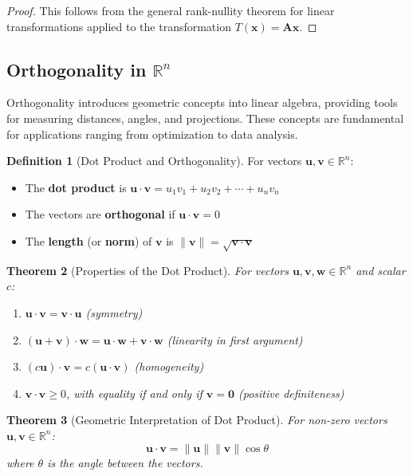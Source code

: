 \documentclass[12pt]{article}
\numberwithin{equation}{section}
\newcommand{\vect}[1]{\boldsymbol{#1}}   %
\newcommand{\mat}[1]{\mathbf{#1}}        %
\theoremstyle{plain}
\newtheorem{theorem}{Theorem}[section]
\theoremstyle{definition}
\newtheorem{definition}[theorem]{Definition}
\theoremstyle{remark}
\begin{document}
\begin{proof}
This follows from the general rank-nullity theorem for linear transformations applied to the transformation $T(\vect{x}) = \mat{A}\vect{x}$.
\end{proof}

\subsection{Orthogonality in $\mathbb{R}^n$}

Orthogonality introduces geometric concepts into linear algebra, providing tools for measuring distances, angles, and projections. These concepts are fundamental for applications ranging from optimization to data analysis.

\begin{definition}[Dot Product and Orthogonality]
For vectors $\vect{u}, \vect{v} \in \mathbb{R}^n$:
\begin{itemize}
\item The \textbf{dot product} is $\vect{u} \cdot \vect{v} = u_1v_1 + u_2v_2 + \cdots + u_nv_n$
\item The vectors are \textbf{orthogonal} if $\vect{u} \cdot \vect{v} = 0$
\item The \textbf{length} (or \textbf{norm}) of $\vect{v}$ is $\|\vect{v}\| = \sqrt{\vect{v} \cdot \vect{v}}$
\end{itemize}
\end{definition}

\begin{theorem}[Properties of the Dot Product]
For vectors $\vect{u}, \vect{v}, \vect{w} \in \mathbb{R}^n$ and scalar $c$:
\begin{enumerate}
\item $\vect{u} \cdot \vect{v} = \vect{v} \cdot \vect{u}$ (symmetry)
\item $(\vect{u} + \vect{v}) \cdot \vect{w} = \vect{u} \cdot \vect{w} + \vect{v} \cdot \vect{w}$ (linearity in first argument)
\item $(c\vect{u}) \cdot \vect{v} = c(\vect{u} \cdot \vect{v})$ (homogeneity)
\item $\vect{v} \cdot \vect{v} \geq 0$, with equality if and only if $\vect{v} = \vect{0}$ (positive definiteness)
\end{enumerate}
\end{theorem}

\begin{theorem}[Geometric Interpretation of Dot Product]
For non-zero vectors $\vect{u}, \vect{v} \in \mathbb{R}^n$:
$$\vect{u} \cdot \vect{v} = \|\vect{u}\|\|\vect{v}\|\cos\theta$$
where $\theta$ is the angle between the vectors.
\end{theorem}
\end{document}

